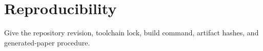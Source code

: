 \section{Reproducibility}
Give the repository revision, toolchain lock, build command, artifact hashes, and generated-paper procedure.
